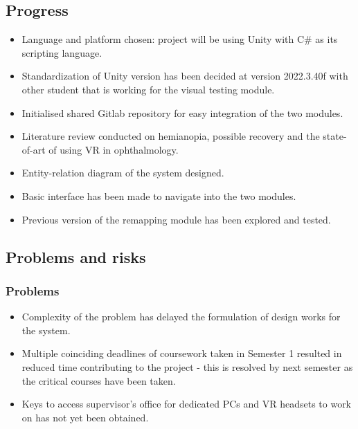 \documentclass[11pt]{article}
\begin{document}
\subsection{Progress}\label{progress}


\begin{itemize}
    \item   Language and platform chosen: project will be using Unity with C\# as its scripting language.
    \item   Standardization of Unity version has been decided at version 2022.3.40f with other student that is working for the visual testing module.
    \item   Initialised shared Gitlab repository for easy integration of the two modules.
    \item   Literature review conducted on hemianopia, possible recovery and the state-of-art of using VR in ophthalmology.
    \item   Entity-relation diagram  of the system designed.
    \item   Basic interface has been made to navigate into the two modules.
    \item   Previous version of the remapping module has been explored and tested.

\end{itemize}

\subsection{Problems and risks}\label{problems-and-risks}

\subsubsection{Problems}\label{problems}

\begin{itemize}

    \item   Complexity of the problem has delayed the formulation of design works for the system.
    \item   Multiple coinciding deadlines of coursework taken in Semester 1 resulted in reduced time contributing to the project - this is resolved by next semester as the critical courses have been taken.
    \item   Keys to access supervisor's office for dedicated PCs and VR headsets to work on has not yet been obtained.

\end{itemize}
\end{document}
